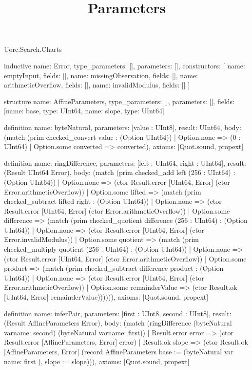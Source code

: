 \begin{lexlean}{Uorc.Search.Charts}
\title{Parameters}
\begin{semanticmodule}
inductive{
  name: Error,
  type_parameters: [],
  parameters: [],
  constructors: [
    {name: emptyInput, fields: []},
    {name: missingObservation, fields: []},
    {name: arithmeticOverflow, fields: []},
    {name: invalidModulus, fields: []}
  ]
}

structure{
  name: AffineParameters,
  type_parameters: [],
  parameters: [],
  fields: [{name: base, type: UInt64}, {name: slope, type: UInt64}]
}

definition{
  name: byteNatural,
  parameters: [value : UInt8],
  result: UInt64,
  body: (match (prim checked_convert value : (Option UInt64))
    | Option.none => (0 : UInt64)
    | Option.some converted => converted),
  axioms: [Quot.sound, propext]
}

definition{
  name: ringDifference,
  parameters: [left : UInt64, right : UInt64],
  result: (Result UInt64 Error),
  body: (match (prim checked_add left (256 : UInt64) : (Option UInt64))
    | Option.none => (ctor Result.error [UInt64, Error] (ctor Error.arithmeticOverflow))
    | Option.some lifted => (match (prim checked_subtract lifted right : (Option UInt64))
      | Option.none => (ctor Result.error [UInt64, Error] (ctor Error.arithmeticOverflow))
      | Option.some difference => (match (prim checked_quotient difference (256 : UInt64) : (Option UInt64))
        | Option.none => (ctor Result.error [UInt64, Error] (ctor Error.invalidModulus))
        | Option.some quotient => (match (prim checked_multiply quotient (256 : UInt64) : (Option UInt64))
          | Option.none => (ctor Result.error [UInt64, Error] (ctor Error.arithmeticOverflow))
          | Option.some product => (match (prim checked_subtract difference product : (Option UInt64))
            | Option.none => (ctor Result.error [UInt64, Error] (ctor Error.arithmeticOverflow))
            | Option.some remainderValue => (ctor Result.ok [UInt64, Error] remainderValue)))))),
  axioms: [Quot.sound, propext]
}

definition{
  name: inferPair,
  parameters: [first : UInt8, second : UInt8],
  result: (Result AffineParameters Error),
  body: (match (ringDifference (byteNatural var{name: second}) (byteNatural var{name: first}))
    | Result.error error => (ctor Result.error [AffineParameters, Error] error)
    | Result.ok slope => (ctor Result.ok [AffineParameters, Error] (record AffineParameters {base := (byteNatural var{
      name: first
    }), slope := slope}))),
  axioms: [Quot.sound, propext]
}


\end{semanticmodule}
\end{lexlean}

